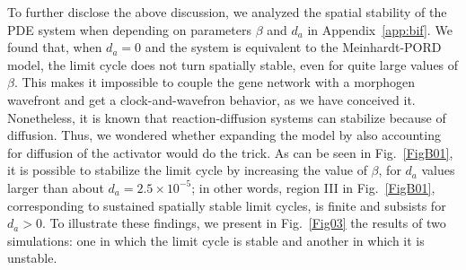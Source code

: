 \documentclass[%
 preprint,
 aip, 
 amsmath,amssymb,
]{revtex4-2}
\begin{document}
To further disclose the above discussion, we analyzed the spatial stability of the PDE system when depending on parameters $\beta$ and $d_a$ in Appendix~\ref{app:bif}. We found that, when $d_a = 0$ and the system is equivalent to the Meinhardt-PORD model, the limit cycle does not turn spatially stable, even for quite large values of $\beta$. This makes it impossible to couple the gene network with a morphogen wavefront and get a clock-and-wavefron behavior, as we have conceived it. Nonetheless, it is known that reaction-diffusion systems can stabilize because of diffusion. Thus, we wondered whether expanding the model by also accounting for diffusion of the activator would do the trick. As can be seen in Fig.~\ref{FigB01}, it is possible to stabilize the limit cycle by increasing the value of $\beta$, for $d_a$ values larger than about $d_a=2.5\times10^{-5}$; in other words, region III in Fig.~\ref{FigB01},  corresponding to sustained spatially stable limit cycles, is finite and subsists for $d_a>0$. To illustrate these findings, we present in Fig.~\ref{Fig03} the results of two simulations: one in which the limit cycle is stable and another in which it is unstable. 
\end{document}
